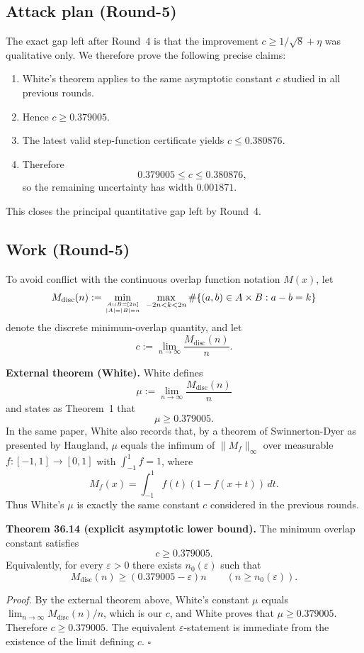 \subsection{Attack plan (Round-5)}
The exact gap left after Round~4 is that the improvement
\(
c\ge 1/\sqrt 8+\eta
\)
was qualitative only.
We therefore prove the following precise claims:
\begin{enumerate}
\item White's theorem applies to the same asymptotic constant \(c\) studied in all previous rounds.
\item Hence \(c\ge 0.379005\).
\item The latest valid step-function certificate yields \(c\le 0.380876\).
\item Therefore
\[
 0.379005\le c\le 0.380876,
\]
so the remaining uncertainty has width \(0.001871\).
\end{enumerate}
This closes the principal quantitative gap left by Round~4.

\subsection{Work (Round-5)}
To avoid conflict with the continuous overlap function notation \(M(x)\), let
\[
M_{\mathrm{disc}}(n):=\min_{A\sqcup B=[2n]\atop |A|=|B|=n}\ \max_{-2n<k<2n}\#\{(a,b)\in A\times B:a-b=k\}
\]
denote the discrete minimum-overlap quantity, and let
\[
 c:=\lim_{n\to\infty}\frac{M_{\mathrm{disc}}(n)}{n}.
\]

\medskip
\noindent\textbf{External theorem (White).}
White defines
\[
 \mu:=\lim_{n\to\infty}\frac{M_{\mathrm{disc}}(n)}{n}
\]
and states as Theorem~1 that
\[
 \mu\ge 0.379005.
\]
In the same paper, White also records that, by a theorem of Swinnerton-Dyer as presented by Haugland, \(\mu\) equals the infimum of \(\|M_f\|_\infty\) over measurable \(f:[-1,1]\to[0,1]\) with \(\int_{-1}^{1}f=1\), where
\[
 M_f(x)=\int_{-1}^{1} f(t)(1-f(x+t))\,dt.
\]
Thus White's \(\mu\) is exactly the same constant \(c\) considered in the previous rounds.

\medskip
\noindent\textbf{Theorem 36.14 (explicit asymptotic lower bound).}
The minimum overlap constant satisfies
\[
 c\ge 0.379005.
\]
Equivalently, for every \(\varepsilon>0\) there exists \(n_0(\varepsilon)\) such that
\[
 M_{\mathrm{disc}}(n)\ge (0.379005-\varepsilon)n
 \qquad (n\ge n_0(\varepsilon)).
\]

\noindent\emph{Proof.}
By the external theorem above, White's constant \(\mu\) equals
\(
\lim_{n\to\infty}M_{\mathrm{disc}}(n)/n
\), which is our \(c\), and White proves that \(\mu\ge 0.379005\).
Therefore \(c\ge 0.379005\).
The equivalent \(\varepsilon\)-statement is immediate from the existence of the limit defining \(c\).
\hfill$\square$

